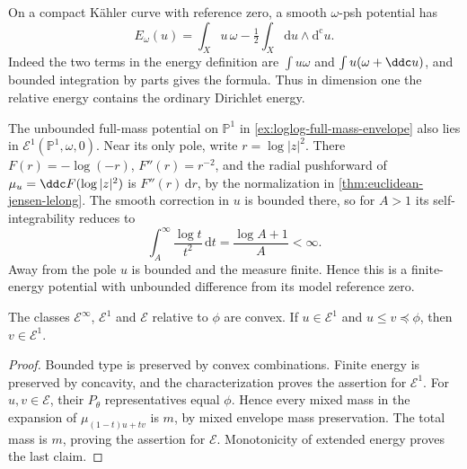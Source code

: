 \begin{example}\label{ex:curve-dirichlet-and-loglog-energy}
On a compact K\"ahler curve with reference zero, a smooth $\omega$-psh potential has
\[
 E_\omega(u)=\int_Xu\,\omega-\tfrac12
                         \int_X\mathrm du\wedge\mathrm d^{\mathrm c}u.
\]
Indeed the two terms in the energy definition are $\int u\omega$ and $\int u(\omega+\ddc u)$, and bounded integration by parts gives the formula. Thus in dimension one the relative energy contains the ordinary Dirichlet energy.

The unbounded full-mass potential on $\mathbb P^1$ in \cref{ex:loglog-full-mass-envelope} also lies in $\mathcal E^1(\mathbb P^1,\omega,0)$. Near its only pole, write $r=\log|z|^2$. There $F(r)=-\log(-r)$, $F''(r)=r^{-2}$, and the radial pushforward of $\mu_u=\ddc F(\log|z|^2)$ is $F''(r)\,\mathrm dr$, by the normalization in \cref{thm:euclidean-jensen-lelong}. The smooth correction in $u$ is bounded there, so for $A>1$ its self-integrability reduces to
\[
 \int_A^\infty\frac{\log t}{t^2}\,\mathrm dt
                         =\frac{\log A+1}{A}<\infty.
\]
Away from the pole $u$ is bounded and the measure finite. Hence this is a finite-energy potential with unbounded difference from its model reference zero.
\end{example}

\begin{corollary}\label{cor:relative-energy-classes-convex}
The classes $\mathcal E^\infty$, $\mathcal E^1$ and $\mathcal E$ relative to $\phi$ are convex. If $u\in\mathcal E^1$ and $u\leq v\preceq\phi$, then $v\in\mathcal E^1$.
\end{corollary}
\begin{proof}
Bounded type is preserved by convex combinations. Finite energy is preserved by concavity, and the characterization proves the assertion for $\mathcal E^1$. For $u,v\in\mathcal E$, their $P_\theta$ representatives equal $\phi$. Hence every mixed mass in the expansion of $\mu_{(1-t)u+tv}$ is $m$, by mixed envelope mass preservation. The total mass is $m$, proving the assertion for $\mathcal E$. Monotonicity of extended energy proves the last claim.
\end{proof}

